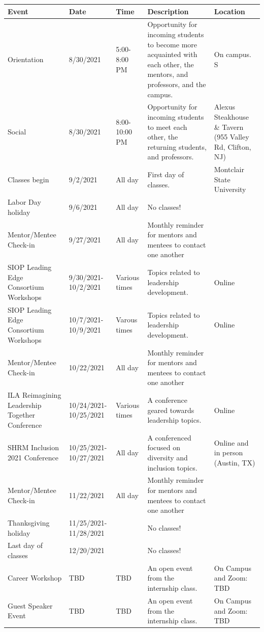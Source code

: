 \documentclass[
  openany]{book}
\begin{document}
\begin{tabular}{l|l|l|l|l}
\hline
Event & Date & Time & Description & Location\\
\hline
Orientation & 8/30/2021 & 5:00-8:00 PM & Opportunity for incoming students to become more acquainted with each other, the mentors, and professors, and the campus. & On campus. S\\
\hline
Social & 8/30/2021 & 8:00-10:00 PM & Opportunity for incoming students to meet each other, the returning students, and professors. & Alexus Steakhouse \& Tavern (955 Valley Rd, Clifton, NJ)\\
\hline
Classes begin & 9/2/2021 & All day & First day of classes. & Montclair State University\\
\hline
Labor Day holiday & 9/6/2021 & All day & No classes! & \\
\hline
Mentor/Mentee Check-in & 9/27/2021 & All day & Monthly reminder for mentors and mentees to contact one another & \\
\hline
SIOP Leading Edge Consortium Workshops & 9/30/2021-10/2/2021 & Various times & Topics related to leadership development. & Online\\
\hline
SIOP Leading Edge Consortium Workshops & 10/7/2021-10/9/2021 & Varous times & Topics related to leadership development. & Online\\
\hline
Mentor/Mentee Check-in & 10/22/2021 & All day & Monthly reminder for mentors and mentees to contact one another & \\
\hline
ILA Reimagining Leadership Together Conference & 10/24/2021-10/25/2021 & Various times & A conference geared towards leadership topics. & Online\\
\hline
SHRM Inclusion 2021 Conference & 10/25/2021-10/27/2021 & All day & A conferenced focused on diversity and inclusion topics. & Online and in person (Austin, TX)\\
\hline
Mentor/Mentee Check-in & 11/22/2021 & All day & Monthly reminder for mentors and mentees to contact one another & \\
\hline
Thanksgiving holiday & 11/25/2021-11/28/2021 &  & No classes! & \\
\hline
Last day of classes & 12/20/2021 &  & No classes! & \\
\hline
Career Workshop & TBD & TBD & An open event from the internship class. & On Campus and Zoom: TBD\\
\hline
Guest Speaker Event & TBD & TBD & An open event from the internship class. & On Campus and Zoom: TBD\\

\end{tabular}
\end{document}
